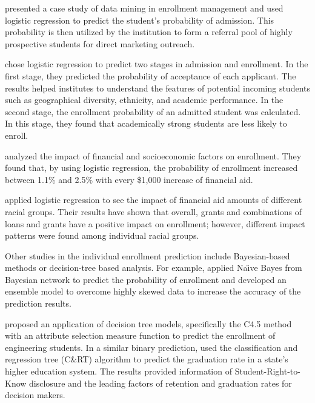 \documentclass[12pt,english]{report}
\begin{document}
\citet{lr_1_chang} presented a case study of data mining in enrollment management and used logistic regression to predict the 
student's probability of admission. This probability is then utilized by the institution to form a referral pool of highly prospective students for direct marketing outreach.

\citet{lr_2} chose logistic regression to predict two stages in admission 
and enrollment. In the first stage, they predicted the probability of 
acceptance of each applicant. The results helped institutes to understand 
the features of potential incoming students such as geographical 
diversity, ethnicity, and academic  performance. In the second stage, the 
enrollment probability of an admitted  student was calculated. In this 
stage, they found that academically strong students are less likely to 
enroll.

\citet{Braunstein1999} analyzed the impact of financial and socioeconomic 
factors on  enrollment. They found that, by using logistic regression, 
the probability of enrollment increased between 1.1\% and  2.5\% with 
every \$1,000 increase of financial aid.

\citet{lr_aid2} applied logistic regression to see the impact of 
financial aid amounts  of different racial groups. Their results have 
shown that overall, grants and  combinations of loans and grants have a 
positive impact on enrollment;  however, different impact patterns were  
found among individual racial groups.


Other studies in the individual enrollment prediction include Bayesian-based methods or decision-tree based analysis. 
For example, \citet{Thanh2007} applied Na{\"\i}ve Bayes  from Bayesian network to predict the probability of enrollment and developed  an ensemble model to overcome highly skewed data to increase the accuracy of  the prediction results. 

\citet{dt_enroll_india} proposed an application of decision tree models, specifically the C4.5 method with an attribute selection measure function to predict the enrollment of engineering students. %
In a similar binary prediction, \citet{Bailey2006} used the classification and regression tree (C\&RT) algorithm to predict the 
graduation rate in a state's higher education system. The results provided information of Student-Right-to-Know disclosure and  
the leading factors of retention and graduation rates for decision makers.
\end{document}
